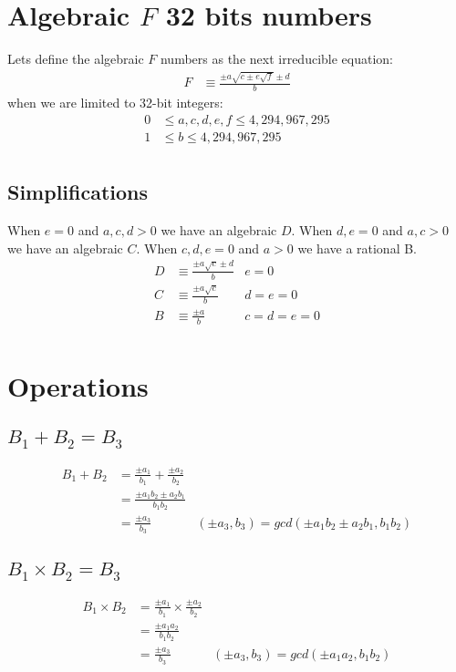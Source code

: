 \documentclass{article}
\begin{document}
\section{Algebraic $F$ 32 bits numbers}
Lets define the algebraic $F$ numbers as the next irreducible equation:
\begin{align*}
F &\equiv \frac{\pm a\sqrt{c \pm e\sqrt{f}} \pm d }{b}
\end{align*}
when we are limited to 32-bit integers:
\begin{align*}
0 &\leq a, c, d, e, f \leq 4,294,967,295\\
1 &\leq b       \leq 4,294,967,295\\
\end{align*}

\subsection{Simplifications}
When $e = 0$ and $a,c,d > 0$ we have an algebraic $D$.
When $d,e = 0$ and $a,c > 0$ we have an algebraic $C$.
When $c,d,e = 0$ and $a > 0$ we have a rational B.
\begin{align*}
D &\equiv \frac{\pm a\sqrt{c} \pm d}{b} & e = 0\\
C &\equiv \frac{\pm a\sqrt{c}}{b}       & d = e = 0\\
B &\equiv \frac{\pm a}{b}               & c = d = e = 0\\
\end{align*}

\section{Operations}

\subsection{$B_1 + B_2 = B_3$}
\begin{align*}
B_1 + B_2 &= \frac{\pm a_1}{b_1} + \frac{\pm a_2}{b_2} \\
 &= \frac{\pm a_1b_2 \pm a_2b_1 }{b_1b_2} \\
 &= \frac{\pm a_3}{b_3} & (\pm a_3,b_3) = gcd(\pm a_1b_2 \pm a_2b_1, b_1b_2)
\end{align*}

\subsection{$B_1 \times B_2 = B_3$}
\begin{align*}
B_1 \times B_2 &= \frac{\pm a_1}{b_1} \times \frac{\pm a_2}{b_2} \\
  &= \frac{\pm a_1a_2}{b_1b_2} \\
  &= \frac{\pm a_3}{b_3} & (\pm a_3,b_3) = gcd(\pm a_1a_2, b_1b_2)
\end{align*}
\end{document}

